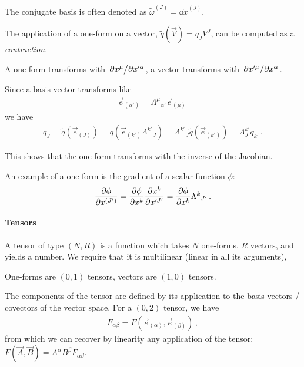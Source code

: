 \documentclass[main.tex]{subfiles}
\begin{document}

The conjugate basis is often denoted as \(\widetilde{\omega}^{(J)} = \dd{\widetilde{x}}^{(J)}\). 

The application of a one-form on a vector, \(\widetilde{q}(\vec{V}) = q_J V^{J}\),
can be computed as a \emph{contraction}. 

A one-form transforms with \(\pdv*{x^{\mu }}{x^{\prime \alpha }}\), 
a vector transforms with \(\pdv*{x^{\prime \mu }}{x^{\alpha }}\). 

Since a basis vector transforms like 
%
\begin{align}
\vec{e}_{(\alpha ')} = \Lambda^{\mu }{}_{\alpha '} \vec{e}_{(\mu) }
\,
\end{align}
%
we have 
%
\begin{align}
q_{J} = \widetilde{q}(\vec{e}_{(J)}) = \widetilde{q}( \vec{e}_{(k')} \Lambda^{k'}{}_J )
= \Lambda^{k'}{}_J \widetilde{q}( \vec{e}_{(k')}) = \Lambda^{k'}_J q_{k'}
\,.
\end{align}

This shows that the one-form transforms with the inverse of the Jacobian. 

An example of a one-form is the gradient of a scalar function \(\phi \): 
%
\begin{align}
\pdv{\phi }{x^{(J')}} = \pdv{\phi }{x^{k}} \pdv{x^{k}}{x^{\prime J'}} = \pdv{\phi }{x^{k}} \Lambda^{k}{}_{J'}
\,.
\end{align}

\paragraph{Tensors}

A tensor of type \((N, R)\) is a function which takes \(N\) one-forms, \(R\) vectors, and yields a number.
We require that it is multilinear (linear in all its arguments), 

One-forms are \((0, 1)\) tensors, vectors are \((1, 0)\) tensors. 

The components of the tensor are defined by its application to the basis vectors / covectors of the vector space. For a \((0, 2)\) tensor, we have 
%
\begin{align}
F_{\alpha \beta } = F( \vec{e}_{(\alpha )}, \vec{e}_{(\beta )})
\,,
\end{align}
%
from which we can recover by linearity any application of the tensor: \(F(\vec{A}, \vec{B}) = A^{\alpha } B^{\beta } F_{\alpha \beta }\). 
\end{document}

